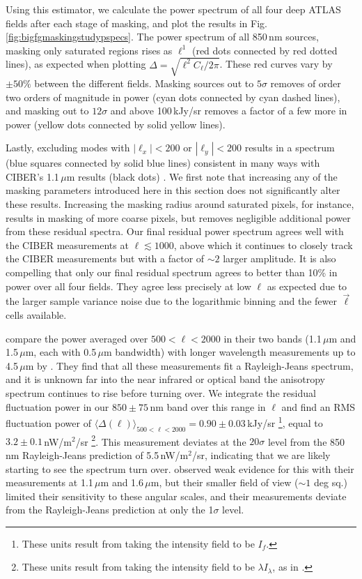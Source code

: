 \documentclass{emulateapj}
\begin{document}
Using this estimator, we calculate the power spectrum of all four deep ATLAS fields after each stage of masking, and plot the results in Fig. \ref{fig:bigfgmaskingstudypspecs}. The power spectrum of all 850\,nm sources, masking only saturated regions rises as $\ell^1$ (red dots connected by red dotted lines), as expected when plotting $\Delta=\sqrt{\ell^2C_\ell/2\pi}$. These red curves vary by $\pm50\%$ between the different fields. Masking sources out to $5\sigma$ removes of order two orders of magnitude in power (cyan dots connected by cyan dashed lines), and masking out to $12\sigma$ and above 100\,kJy/sr removes a factor of a few more in power (yellow dots connected by solid yellow lines). 

Lastly, excluding modes with $|\ell_x|<200$ or $|\ell_y|<200$ results in a spectrum (blue squares connected by solid blue lines) consistent in many ways with CIBER's 1.1\,$\mu$m results (black dots) \citep{zemcov14}. We first note that increasing any of the masking parameters introduced here in this section does not significantly alter these results. Increasing the masking radius around saturated pixels, for instance, results in masking of more coarse pixels, but removes negligible additional power from these residual spectra. Our final residual power spectrum agrees well with the CIBER measurements at $\ell\lesssim1000$, above which it continues to closely track the CIBER measurements but with a factor of $\sim2$ larger amplitude. It is also compelling that only our final residual spectrum agrees to better than 10\% in power over all four fields. They agree less precisely at low $\ell$ as expected due to the larger sample variance noise due to the logarithmic binning and the fewer $\vec{\ell}$ cells available. 

\citet{zemcov14} compare the power averaged over $500<\ell<2000$ in their two bands (1.1\,$\mu$m and 1.5\,$\mu$m, each with 0.5\,$\mu$m bandwidth) with longer wavelength measurements up to 4.5\,$\mu$m by \citet{cooray12,kash3,matsumoto11}. They find that all these measurements fit a Rayleigh-Jeans spectrum, and it is unknown far into the near infrared or optical band the anisotropy spectrum continues to rise before turning over. We integrate the residual fluctuation power in our $850\pm75$\,nm band over this range in $\ell$ and find an RMS fluctuation power of $\langle\Delta(\ell)\rangle_{500<\ell<2000}=0.90\pm0.03$\,kJy/sr \footnote{These units result from taking the intensity field to be $I_f$.}, equal to $3.2\pm0.1$\,nW/m$^2$/sr \footnote{These units result from taking the intensity field to be $\lambda I_\lambda$, as in \citet{zemcov14}.}. This measurement deviates at the $20\sigma$ level from the 850\,nm Rayleigh-Jeans prediction of 5.5\,nW/m$^2$/sr, indicating that we are likely starting to see the spectrum turn over. \citet{zemcov14} observed weak evidence for this with their measurements at 1.1\,$\mu$m and 1.6\,$\mu$m, but their smaller field of view ($\sim1$ deg sq.) limited their sensitivity to these angular scales, and their measurements deviate from the Rayleigh-Jeans prediction at only the 1$\sigma$ level. 
\end{document}
